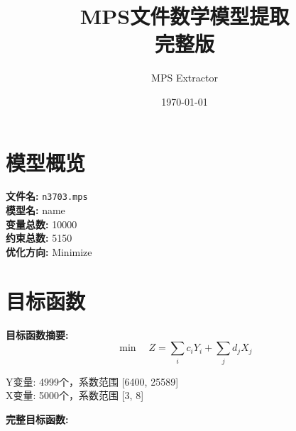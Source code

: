 \documentclass[a4paper,10pt]{article}
\title{MPS文件数学模型提取\\{\large 完整版}}
\author{MPS Extractor}
\date{\today}
\begin{document}
\maketitle
\tableofcontents
\newpage

\section{模型概览}

\textbf{文件名:} \texttt{n3703.mps} \\
\textbf{模型名:} name \\
\textbf{变量总数:} 10000 \\
\textbf{约束总数:} 5150 \\
\textbf{优化方向:} Minimize \\

\section{目标函数}

\textbf{目标函数摘要:}
\begin{equation}
\min \quad Z = \sum_{i} c_i Y_i + \sum_{j} d_j X_j
\end{equation}

Y变量: 4999个，系数范围 [6400, 25589] \\
X变量: 5000个，系数范围 [3, 8]

\textbf{完整目标函数:}
\end{document}
